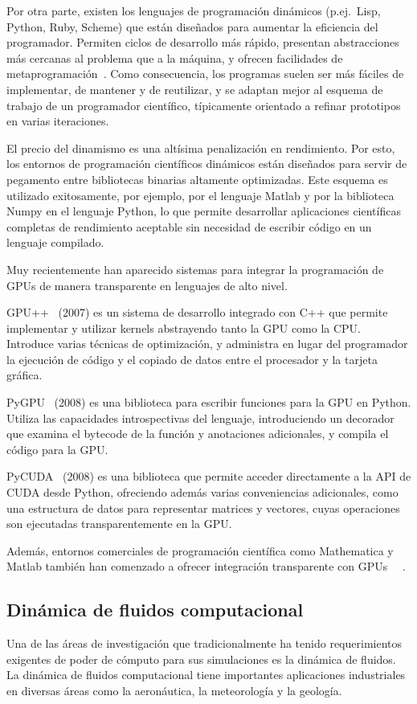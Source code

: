 \documentclass[11pt,spanish]{article}
\begin{document}
Por otra parte, existen los lenguajes de programación dinámicos (p.ej.~Lisp,
Python, Ruby, Scheme) que están diseñados para aumentar la eficiencia
del programador.  Permiten ciclos de desarrollo más rápido, presentan
abstracciones más cercanas al problema que a la máquina, y ofrecen
facilidades de metaprogramación~\cite[\S2]{pygpu}.  Como consecuencia, los
programas suelen ser más fáciles de implementar, de mantener y de reutilizar,
y se adaptan mejor al esquema de trabajo de un programador científico,
típicamente orientado a refinar prototipos en varias iteraciones.

El precio del dinamismo es una altísima penalización en rendimiento.  Por esto,
los entornos de programación científicos dinámicos están diseñados para servir
de pegamento entre bibliotecas binarias altamente optimizadas.  Este esquema es
utilizado exitosamente, por ejemplo, por el lenguaje Matlab y por la biblioteca
Numpy en el lenguaje Python, lo que permite desarrollar aplicaciones científicas
completas de rendimiento aceptable sin necesidad de escribir código en un
lenguaje compilado.

Muy recientemente han aparecido sistemas para integrar la programación de GPUs
de manera transparente en lenguajes de alto nivel.

GPU++~\cite{gpupp} (2007) es un sistema de desarrollo integrado con C++ que
permite implementar y utilizar kernels abstrayendo tanto la GPU como la CPU.
Introduce varias técnicas de optimización, y administra en lugar del programador
la ejecución de código y el copiado de datos entre el procesador y la tarjeta
gráfica.

PyGPU~\cite{pygpu} (2008) es una biblioteca para escribir funciones para la
GPU en Python. Utiliza las capacidades introspectivas del lenguaje,
introduciendo un decorador que examina el bytecode de la función y anotaciones
adicionales, y compila el código para la GPU.

PyCUDA~\cite{pycuda} (2008) es una biblioteca que permite acceder directamente a
la API de CUDA desde Python, ofreciendo además varias conveniencias adicionales,
como una estructura de datos para representar matrices y vectores, cuyas
operaciones son ejecutadas transparentemente en la GPU.

Además, entornos comerciales de programación científica como Mathematica y
Matlab también han comenzado a ofrecer integración transparente con GPUs~%
\cite{nvidia-mathematica}~\cite{nvidia-matlab}.


\subsection{Dinámica de fluidos computacional}
Una de las áreas de investigación que tradicionalmente ha tenido requerimientos
exigentes de poder de cómputo para sus simulaciones es la dinámica de fluidos.
La dinámica de fluidos computacional tiene importantes aplicaciones industriales
en diversas áreas como la aeronáutica, la meteorología y la geología.
\end{document}
